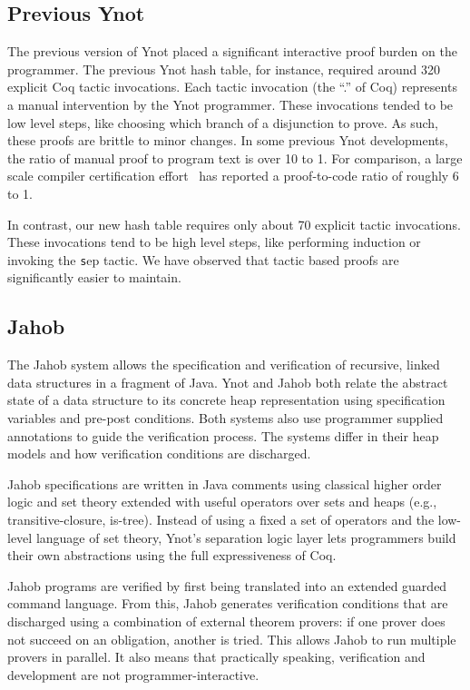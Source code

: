 \documentclass[preprint,nocopyrightspace]{sigplanconf}
\begin{document}
{\subsection{Previous Ynot}

The previous version of Ynot placed a significant interactive proof
burden on the programmer.  The previous Ynot hash table, for instance,
required around 320 explicit Coq tactic invocations.  Each tactic
invocation (the ``.'' of Coq) represents a manual intervention by the
Ynot programmer.  These invocations tended to be low level steps, like
choosing which branch of a disjunction to prove.  As such, these
proofs are brittle to minor changes.  In some previous
Ynot developments, the ratio of manual proof to program text is over
10 to 1. For comparison, a large scale compiler certification
effort~\cite{leroy} has reported a proof-to-code ratio of roughly 6 to
1.

In contrast, our new hash table requires only about 70 explicit tactic invocations. 
These invocations tend to be high level steps, like performing induction or
invoking the {\texttt sep} tactic.  We have observed that tactic based proofs
are significantly easier to maintain.  

\subsection{Jahob}

The Jahob system allows the specification and verification 
of recursive, linked data structures in a fragment of Java.  Ynot and Jahob 
both relate the abstract state of a data structure to its concrete heap representation
using specification variables and pre-post conditions. Both systems also use
programmer supplied annotations to guide the verification process.  The systems 
differ in their heap models and how verification conditions are discharged.

Jahob specifications are written in Java comments using classical higher order
logic and set theory extended with useful operators over sets and heaps (e.g., 
transitive-closure, is-tree).  Instead of using a fixed a set of operators and
the low-level language of set theory, Ynot's separation logic layer lets 
programmers build their own abstractions using the full expressiveness of Coq.  
 
Jahob programs are verified by first being translated into an extended guarded command language.
From this, Jahob generates verification conditions 
 that are discharged using a combination of external theorem provers: if one prover does not succeed 
on an obligation, another is tried.  This allows Jahob to run multiple
provers in parallel.  It also means that practically speaking, verification 
and development are not programmer-interactive.

}
\end{document}
